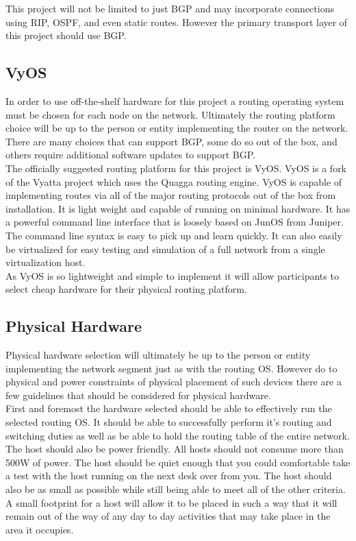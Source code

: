 \documentclass[12pt]{article}
\begin{document}
This project will not be limited to just BGP and may incorporate connections using RIP, OSPF, and even static routes. However the primary transport
layer of this project should use BGP.


\subsection{VyOS}

In order to use off-the-shelf hardware for this project a routing operating system must be chosen for each node on the network. Ultimately the routing
platform choice will be up to the person or entity implementing the router on the network. There are many choices that can support BGP, some do so
out of the box, and others require additional software updates to support BGP.
\\

The officially suggested routing platform for this project is VyOS. VyOS is a fork of the Vyatta project which uses the Quagga routing engine. VyOS
is capable of implementing routes via all of the major routing protocols out of the box from installation. It is light weight and capable of running
on minimal hardware. It has a powerful command line interface that is loosely based on JunOS from Juniper. The command line syntax is easy to pick up
and learn quickly. It can also easily be virtualized for easy testing and simulation of a full network from a single virtualization host. 
\\

As VyOS is so lightweight and simple to implement it will allow participants to select cheap hardware for their physical routing platform. 


\subsection{Physical Hardware}

Physical hardware selection will ultimately be up to the person or entity implementing the network segment just as with the routing OS. However
do to physical and power constraints of physical placement of such devices there are a few guidelines that should be considered for physical hardware.
\\

First and foremost the hardware selected should be able to effectively run the selected routing OS. It should be able to successfully perform it's routing
and switching duties as well as be able to hold the routing table of the entire network. The host should also be power friendly. All hosts should not consume
more than 500W of power. The host should be quiet enough that you could comfortable take a test with the host running on the next desk over from you. The host
should also be as small as possible while still being able to meet all of the other criteria. A small footprint for a host will allow it to be placed in such
a way that it will remain out of the way of any day to day activities that may take place in the area it occupies.
\\
\end{document}
